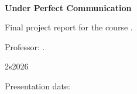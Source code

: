 \begingroup
\thispagestyle{empty}
\centering
\color{black}

{\sffamily\bfseries\fontsize{12}{15}\selectfont\ProjectAuthor\par}
\vspace{3.5cm}

{\bfseries\fontsize{23}{29}\selectfont
 \ProjectTitle\\Under Perfect Communication\par}
\vspace{1.6cm}

\begin{flushright}
\begin{minipage}{0.54\textwidth}
\small\raggedright
Final project report for the course
\ProjectCourse.
\par\vspace{0.45cm}
Professor: \ProjectProfessor.
\end{minipage}
\end{flushright}
\vfill

{\sffamily\fontsize{10}{13}\selectfont 2s2026\par}
\vspace{0.18cm}
{\fontsize{10}{13}\selectfont
 Presentation date: \FinalPresentationDate\par}
\endgroup
